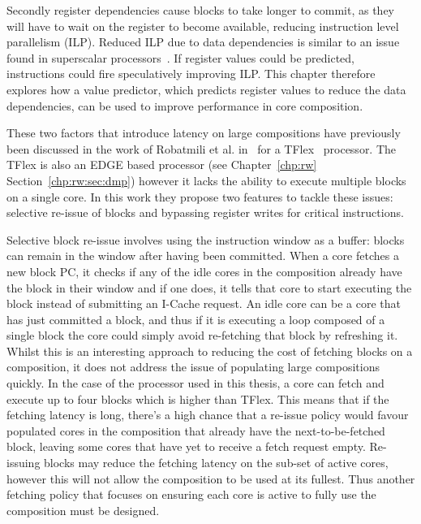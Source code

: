 Secondly register dependencies cause blocks to take longer to commit, as they will have to wait on the register to become available, reducing instruction level parallelism (ILP).
Reduced ILP due to data dependencies is similar to an issue found in superscalar processors~\cite{peraisBeBop2015}.
If register values could be predicted, instructions could fire speculatively improving ILP.
This chapter therefore explores how a value predictor, which predicts register values to reduce the data dependencies, can be used to improve performance in core composition.

These two factors that introduce latency on large compositions have previously been discussed in the work of Robatmili et al. in~\cite{robatmili2011uniproc} for a TFlex~\cite{kim2007tflex} processor.
The TFlex is also an EDGE based processor (see Chapter~\ref{chp:rw} Section~\ref{chp:rw:sec:dmp}) however it lacks the ability to execute multiple blocks on a single core.
In this work they propose two features to tackle these issues: selective re-issue of blocks and bypassing register writes for critical instructions.

Selective block re-issue involves using the instruction window as a buffer: blocks can remain in the window after having been committed.
When a core fetches a new block PC, it checks if any of the idle cores in the composition already have the block in their window and if one does, it tells that core to start executing the block instead of submitting an I-Cache request.
An idle core can be a core that has just committed a block, and thus if it is executing a loop composed of a single block the core could simply avoid re-fetching that block by refreshing it.
Whilst this is an interesting approach to reducing the cost of fetching blocks on a composition, it does not address the issue of populating large compositions quickly.
In the case of the processor used in this thesis, a core can fetch and execute up to four blocks which is higher than TFlex.
This means that if the fetching latency is long, there's a high chance that a re-issue policy would favour populated cores in the composition that already have the next-to-be-fetched block, leaving some cores that have yet to receive a fetch request empty.
Re-issuing blocks may reduce the fetching latency on the sub-set of active cores, however this will not allow the composition to be used at its fullest.
Thus another fetching policy that focuses on ensuring each core is active to fully use the composition must be designed.

